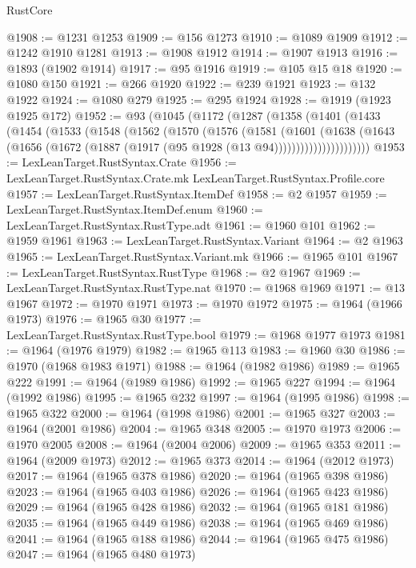 \begin{lexlean}{RustCore}
\begin{coremodule}
@1908 := @1231 @1253
@1909 := @156 @1273
@1910 := @1089 @1909
@1912 := @1242 @1910 @1281
@1913 := @1908 @1912
@1914 := @1907 @1913
@1916 := @1893 (@1902 @1914)
@1917 := @95 @1916
@1919 := @105 @15 @18
@1920 := @1080 @150
@1921 := @266 @1920
@1922 := @239 @1921
@1923 := @132 @1922
@1924 := @1080 @279
@1925 := @295 @1924
@1928 := @1919 (@1923 @1925 @172)
@1952 := @93
    (@1045
      (@1172
        (@1287
          (@1358
            (@1401
              (@1433
                (@1454
                  (@1533
                    (@1548
                      (@1562
                        (@1570
                          (@1576
                            (@1581
                              (@1601
                                (@1638
                                  (@1643
                                    (@1656
                                      (@1672 (@1887 (@1917 (@95 @1928 (@13 @94))))))))))))))))))))))
@1953 := LexLeanTarget.RustSyntax.Crate
@1956 := LexLeanTarget.RustSyntax.Crate.mk LexLeanTarget.RustSyntax.Profile.core
@1957 := LexLeanTarget.RustSyntax.ItemDef
@1958 := @2 @1957
@1959 := LexLeanTarget.RustSyntax.ItemDef.enum
@1960 := LexLeanTarget.RustSyntax.RustType.adt
@1961 := @1960 @101
@1962 := @1959 @1961
@1963 := LexLeanTarget.RustSyntax.Variant
@1964 := @2 @1963
@1965 := LexLeanTarget.RustSyntax.Variant.mk
@1966 := @1965 @101
@1967 := LexLeanTarget.RustSyntax.RustType
@1968 := @2 @1967
@1969 := LexLeanTarget.RustSyntax.RustType.nat
@1970 := @1968 @1969
@1971 := @13 @1967
@1972 := @1970 @1971
@1973 := @1970 @1972
@1975 := @1964 (@1966 @1973)
@1976 := @1965 @30
@1977 := LexLeanTarget.RustSyntax.RustType.bool
@1979 := @1968 @1977 @1973
@1981 := @1964 (@1976 @1979)
@1982 := @1965 @113
@1983 := @1960 @30
@1986 := @1970 (@1968 @1983 @1971)
@1988 := @1964 (@1982 @1986)
@1989 := @1965 @222
@1991 := @1964 (@1989 @1986)
@1992 := @1965 @227
@1994 := @1964 (@1992 @1986)
@1995 := @1965 @232
@1997 := @1964 (@1995 @1986)
@1998 := @1965 @322
@2000 := @1964 (@1998 @1986)
@2001 := @1965 @327
@2003 := @1964 (@2001 @1986)
@2004 := @1965 @348
@2005 := @1970 @1973
@2006 := @1970 @2005
@2008 := @1964 (@2004 @2006)
@2009 := @1965 @353
@2011 := @1964 (@2009 @1973)
@2012 := @1965 @373
@2014 := @1964 (@2012 @1973)
@2017 := @1964 (@1965 @378 @1986)
@2020 := @1964 (@1965 @398 @1986)
@2023 := @1964 (@1965 @403 @1986)
@2026 := @1964 (@1965 @423 @1986)
@2029 := @1964 (@1965 @428 @1986)
@2032 := @1964 (@1965 @181 @1986)
@2035 := @1964 (@1965 @449 @1986)
@2038 := @1964 (@1965 @469 @1986)
@2041 := @1964 (@1965 @188 @1986)
@2044 := @1964 (@1965 @475 @1986)
@2047 := @1964 (@1965 @480 @1973)

\end{coremodule}
\end{lexlean}
